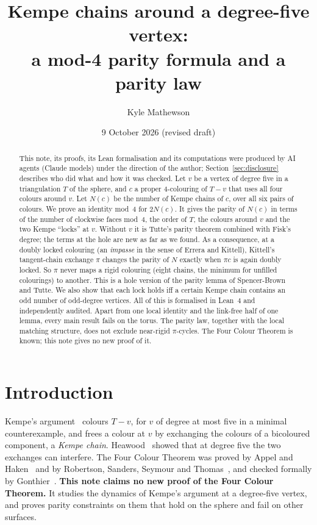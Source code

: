 \documentclass[11pt]{article}
\title{Kempe chains around a degree-five vertex:\\ a mod-4 parity formula and a parity law}
\author{Kyle Mathewson}
\date{9 October 2026 (revised draft)}
\theoremstyle{definition}
\begin{document}
\maketitle

\begin{abstract}
This note, its proofs, its Lean formalisation and its computations were produced by AI agents (Claude models) under the direction of the author; Section~\ref{sec:disclosure} describes who did what and how it was checked.
Let $v$ be a vertex of degree five in a triangulation $T$ of the sphere, and $c$ a proper $4$-colouring of $T-v$ that uses all four colours around $v$. Let $N(c)$ be the number of Kempe chains of $c$, over all six pairs of colours. We prove an identity mod~4 for $2N(c)$. It gives the parity of $N(c)$ in terms of the number of clockwise faces mod~4, the order of $T$, the colours around $v$ and the two Kempe ``locks'' at $v$. Without $v$ it is Tutte's parity theorem combined with Fisk's degree; the terms at the hole are new as far as we found. As a consequence, at a doubly locked colouring (an \emph{impasse} in the sense of Errera and Kittell), Kittell's tangent-chain exchange $\pi$ changes the parity of $N$ exactly when $\pi c$ is again doubly locked. So $\pi$ never maps a rigid colouring (eight chains, the minimum for unfilled colourings) to another. This is a hole version of the parity lemma of Spencer-Brown and Tutte. We also show that each lock holds iff a certain Kempe chain contains an odd number of odd-degree vertices. All of this is formalised in Lean~4 and independently audited. Apart from one local identity and the link-free half of one lemma, every main result fails on the torus. The parity law, together with the local matching structure, does not exclude near-rigid $\pi$-cycles. The Four Colour Theorem is known; this note gives no new proof of it.
\end{abstract}

\section{Introduction}\label{sec:intro}
Kempe's argument~\cite{kempe1879} colours $T-v$, for $v$ of degree at most five in a minimal counterexample, and frees a colour at $v$ by exchanging the colours of a bicoloured component, a \emph{Kempe chain}. Heawood~\cite{heawood1890} showed that at degree five the two exchanges can interfere. The Four Colour Theorem was proved by Appel and Haken~\cite{appel1977} and by Robertson, Sanders, Seymour and Thomas~\cite{robertson1997}, and checked formally by Gonthier~\cite{gonthier}. \textbf{This note claims no new proof of the Four Colour Theorem.} It studies the dynamics of Kempe's argument at a degree-five vertex, and proves parity constraints on them that hold on the sphere and fail on other surfaces.
\end{document}
